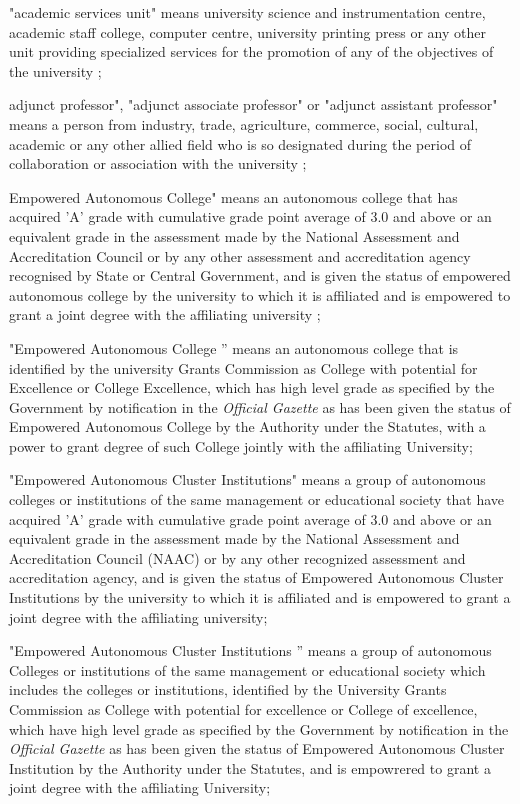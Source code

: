 \documentclass[default]{mhact}
\begin{document}
      \begin{subsectionlist}
    

"academic services unit" means university science and instrumentation centre, academic staff college, computer centre, university printing press or any other unit providing specialized services for the promotion of any of the objectives of the university ;


adjunct professor", "adjunct associate professor" or "adjunct assistant professor" means a person from industry, trade, agriculture, commerce, social, cultural, academic or any other allied field who is so designated during the period of collaboration or association with the university ;


Empowered Autonomous College" means an autonomous college that has acquired 'A' grade with cumulative grade point average of 3.0 and above or an equivalent grade in the assessment made by the National Assessment and Accreditation Council or by any other assessment and accreditation agency recognised by State or Central Government, and is given the status of empowered autonomous college by the university to which it is affiliated and is empowered to grant a joint degree with the affiliating university ;


"Empowered Autonomous College '' means an autonomous college that is identified by the university Grants Commission as College with potential for Excellence or College Excellence, which has high level grade as specified by the Government by notification in the \emph{Official Gazette} as has been given the status of Empowered Autonomous College by the Authority under the Statutes, with a power to grant degree of such College jointly with the affiliating University;


"Empowered Autonomous Cluster Institutions" means a group of autonomous colleges or institutions of the same management or educational society that have acquired 'A' grade with cumulative grade point average of 3.0 and above or an equivalent grade in the assessment made by the National Assessment and Accreditation Council (NAAC) or by any other recognized assessment and accreditation agency, and is given the status of Empowered Autonomous Cluster Institutions by the university to which it is affiliated and is empowered to grant a joint degree with the affiliating university;


"Empowered Autonomous Cluster Institutions '' means a group of autonomous Colleges or institutions of the same management or educational society which includes the colleges or institutions, identified by the University Grants Commission as College with potential for excellence or College of excellence, which have high level grade as specified by the Government by notification in the \emph{Official Gazette} as has been given the status of Empowered Autonomous Cluster Institution by the Authority under the Statutes, and is empowrered to grant a joint degree with the affiliating University;

       \end{subsectionlist}
    
\end{document}
